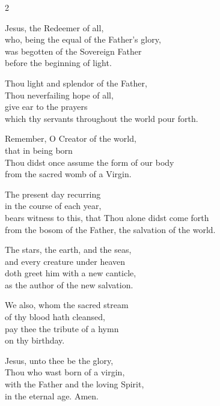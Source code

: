 \documentclass[12pt]{book}
\begin{document}
\begin{multicols}{2}
\begin{enpars}
Jesus, the Redeemer of all,\\
who, being the equal of the Father's glory,\\
was begotten of the Sovereign Father\\
before the beginning of light.

Thou light and splendor of the Father,\\
Thou neverfailing hope of all,\\
give ear to the prayers\\
 which thy servants throughout the world pour forth.
 
Remember, O Creator of the world,\\
that in being born\\
Thou didst once assume the form of our body\\
 from the sacred womb of a Virgin.
 
The present day recurring\\
 in the course of each year,\\
 bears witness to this, that Thou alone didst come forth\\
 from the bosom of the Father, the salvation of the world.
 
The stars, the earth, and the seas,\\
and every creature under heaven\\
doth greet him with a new canticle,\\
as the author of the new salvation.
 
We also, whom the sacred stream\\
 of thy blood hath cleansed,\\pay thee the tribute of a hymn\\
 on thy birthday.
 
Jesus, unto thee be the glory,\\
 Thou who wast born of a virgin,\\
 with the Father and the loving Spirit,\\
 in the eternal age. Amen.

\end{enpars}
\end{multicols}


\label{versiculus_2_vesperis_nativitatis_domini}
\end{document}
